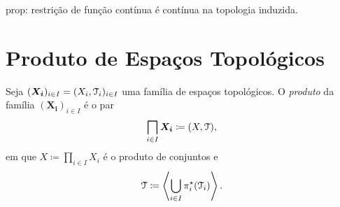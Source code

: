 prop: restrição de função contínua é contínua na topologia induzida.







\chapter{Produto de Espaços Topológicos}

\begin{defi}
Seja $(\bm{X_i})_{i \in I} = (X_i,\mathcal{T}_i)_{i \in I}$ uma família de espaços topológicos. O \emph{produto} da família $(\bm{X_i})_{i \in I}$ é o par
	\begin{equation*}
	\prod_{i \in I} \bm{X_i} \coloneqq (X,\topo),
	\end{equation*}
em que $X \coloneqq \prod_{i \in I} X_i$ é o produto de conjuntos e
	\begin{equation*}
	\topo \coloneqq \ger{\bigcup_{i \in I}\pi_i^\star(\topo_i)}.
	\end{equation*}
\end{defi}


